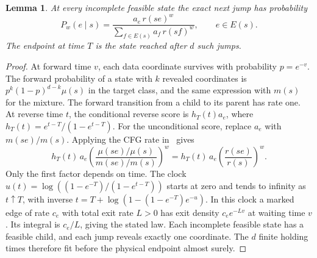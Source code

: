 \documentclass[11pt]{article}
\newtheorem{lemma}[theorem]{Lemma}
\begin{document}
\begin{lemma}\label{lem:race}
At every incomplete feasible state the exact next jump has probability
\[
 P_w(e\mid s)=\frac{a_e\,r(se)^w}{\sum_{f\in E(s)}a_f\,r(sf)^w},\qquad e\in E(s).
\]
The endpoint at time \(T\) is the state reached after \(d\) such jumps.
\end{lemma}
\begin{proof}
At forward time \(v\), each data coordinate survives with probability \(p=e^{-v}\). The forward probability of a state with \(k\) revealed coordinates is \(p^k(1-p)^{d-k}\mu(s)\) in the target class, and the same expression with \(m(s)\) for the mixture. The forward transition from a child to its parent has rate one. At reverse time \(t\), the conditional reverse score is \(h_T(t)a_e\), where \(h_T(t)=e^{t-T}/(1-e^{t-T})\). For the unconditional score, replace \(a_e\) with \(m(se)/m(s)\). Applying the CFG rate in~\cite[Eq.~(9)]{he} gives
\[
 h_T(t)\,a_e\!\left(\frac{\mu(se)/\mu(s)}{m(se)/m(s)}\right)^w
 =h_T(t)\,a_e\!\left(\frac{r(se)}{r(s)}\right)^w .
\]
Only the first factor depends on time. The clock \(u(t)=\log((1-e^{-T})/(1-e^{t-T}))\) starts at zero and tends to infinity as \(t\uparrow T\), with inverse \(t=T+\log(1-(1-e^{-T})e^{-u})\). In this clock a marked edge of rate \(c_e\) with total exit rate \(L>0\) has exit density \(c_e e^{-Lv}\) at waiting time \(v\). Its integral is \(c_e/L\), giving the stated law. Each incomplete feasible state has a feasible child, and each jump reveals exactly one coordinate. The \(d\) finite holding times therefore fit before the physical endpoint almost surely.
\end{proof}
\end{document}
